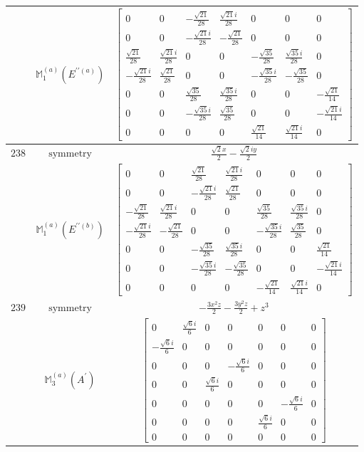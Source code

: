 \documentclass[fleqn,8pt,landscape]{jsarticle}
\begin{document}
\begin{longtable}{ccc}
$  $ & $ \mathbb{M}_{1}^{(a)}(E^{\prime\prime(a)}) $ & $ \begin{bmatrix} 0 & 0 & - \frac{\sqrt{21}}{28} & \frac{\sqrt{21} i}{28} & 0 & 0 & 0 \\ 0 & 0 & - \frac{\sqrt{21} i}{28} & - \frac{\sqrt{21}}{28} & 0 & 0 & 0 \\ \frac{\sqrt{21}}{28} & \frac{\sqrt{21} i}{28} & 0 & 0 & - \frac{\sqrt{35}}{28} & \frac{\sqrt{35} i}{28} & 0 \\ - \frac{\sqrt{21} i}{28} & \frac{\sqrt{21}}{28} & 0 & 0 & - \frac{\sqrt{35} i}{28} & - \frac{\sqrt{35}}{28} & 0 \\ 0 & 0 & \frac{\sqrt{35}}{28} & \frac{\sqrt{35} i}{28} & 0 & 0 & - \frac{\sqrt{21}}{14} \\ 0 & 0 & - \frac{\sqrt{35} i}{28} & \frac{\sqrt{35}}{28} & 0 & 0 & - \frac{\sqrt{21} i}{14} \\ 0 & 0 & 0 & 0 & \frac{\sqrt{21}}{14} & \frac{\sqrt{21} i}{14} & 0 \end{bmatrix} $ \\ \hline
$ 238 $ & $ \text{symmetry} $ & $ \frac{\sqrt{2} x}{2} - \frac{\sqrt{2} i y}{2} $ \\
$  $ & $ \mathbb{M}_{1}^{(a)}(E^{\prime\prime(b)}) $ & $ \begin{bmatrix} 0 & 0 & \frac{\sqrt{21}}{28} & \frac{\sqrt{21} i}{28} & 0 & 0 & 0 \\ 0 & 0 & - \frac{\sqrt{21} i}{28} & \frac{\sqrt{21}}{28} & 0 & 0 & 0 \\ - \frac{\sqrt{21}}{28} & \frac{\sqrt{21} i}{28} & 0 & 0 & \frac{\sqrt{35}}{28} & \frac{\sqrt{35} i}{28} & 0 \\ - \frac{\sqrt{21} i}{28} & - \frac{\sqrt{21}}{28} & 0 & 0 & - \frac{\sqrt{35} i}{28} & \frac{\sqrt{35}}{28} & 0 \\ 0 & 0 & - \frac{\sqrt{35}}{28} & \frac{\sqrt{35} i}{28} & 0 & 0 & \frac{\sqrt{21}}{14} \\ 0 & 0 & - \frac{\sqrt{35} i}{28} & - \frac{\sqrt{35}}{28} & 0 & 0 & - \frac{\sqrt{21} i}{14} \\ 0 & 0 & 0 & 0 & - \frac{\sqrt{21}}{14} & \frac{\sqrt{21} i}{14} & 0 \end{bmatrix} $ \\ \hline
$ 239 $ & $ \text{symmetry} $ & $ - \frac{3 x^{2} z}{2} - \frac{3 y^{2} z}{2} + z^{3} $ \\
$  $ & $ \mathbb{M}_{3}^{(a)}(A^{\prime}) $ & $ \begin{bmatrix} 0 & \frac{\sqrt{6} i}{6} & 0 & 0 & 0 & 0 & 0 \\ - \frac{\sqrt{6} i}{6} & 0 & 0 & 0 & 0 & 0 & 0 \\ 0 & 0 & 0 & - \frac{\sqrt{6} i}{6} & 0 & 0 & 0 \\ 0 & 0 & \frac{\sqrt{6} i}{6} & 0 & 0 & 0 & 0 \\ 0 & 0 & 0 & 0 & 0 & - \frac{\sqrt{6} i}{6} & 0 \\ 0 & 0 & 0 & 0 & \frac{\sqrt{6} i}{6} & 0 & 0 \\ 0 & 0 & 0 & 0 & 0 & 0 & 0 \end{bmatrix} $ \\ \hline

\end{longtable}
\end{document}
